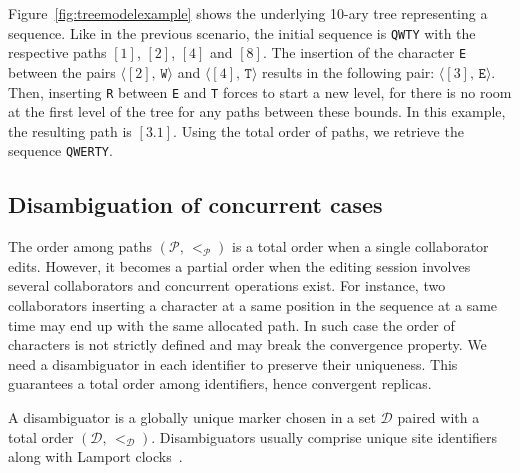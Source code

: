 Figure~\ref{fig:treemodelexample} shows the underlying 10-ary tree representing
a sequence. Like in the previous scenario, the initial sequence is \texttt{QWTY}
with the respective paths $[1]$, $[2]$, $[4]$ and $[8]$. The insertion of the
character \texttt{E} between the pairs $\langle [2],\, \texttt{W}\rangle$ and
$\langle [4],\, \texttt{T}\rangle$ results in the following pair:
$\langle [3],\, \texttt{E} \rangle$. Then, inserting \texttt{R} between
\texttt{E} and \texttt{T} forces to start a new level, for there is no room at
the first level of the tree for any paths between these bounds. In this example,
the resulting path is $[3.1]$. Using the total order of paths, we retrieve the
sequence \texttt{QWERTY}.




\subsection{Disambiguation of concurrent cases}
\label{subsec:disambiguation}

The order among paths $(\mathcal{P},\,<_\mathcal{P})$ is a total order when a
single collaborator edits. However, it becomes a partial order when the editing
session involves several collaborators and concurrent operations exist. For
instance, two collaborators inserting a character at a same position in the
sequence at a same time may end up with the same allocated path. In such case
the order of characters is not strictly defined and may break the convergence
property. We need a disambiguator in each identifier to preserve their
uniqueness. This guarantees a total order among identifiers, hence convergent
replicas.

\begin{definition}[Disambiguator]
  A disambiguator is a globally unique marker chosen in a set $\mathcal{D}$
  paired with a total order $(\mathcal{D},\, <_\mathcal{D})$. Disambiguators
  usually comprise unique site identifiers along with Lamport
  clocks~\cite{lamport1978time}.
\end{definition}

